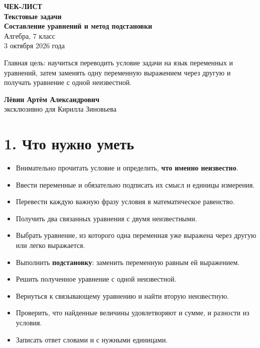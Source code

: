 \documentclass[a4paper,12pt]{article}
\newcommand{\checkitem}{\item[$\square$]}
\newcommand{\key}[1]{\textbf{\color{darkaccent}#1}}
\newcommand{\sepLine}{\vspace{0.35em}{\color{accent}\hrule height 0.6pt}\vspace{0.8em}}
\begin{document}
\thispagestyle{empty}
\begin{center}
\vspace*{25mm}
{\Large\color{accent}\textbf{ЧЕК-ЛИСТ}}\\[8mm]
{\huge\bfseries Текстовые задачи}\\[3mm]
{\LARGE\bfseries Составление уравнений и метод подстановки}\\[13mm]
{\large Алгебра, 7 класс}\\[4mm]
{\large 3 октября 2026 года}\\[20mm]

\begin{minipage}{0.78\textwidth}
\centering
\large
Главная цель: научиться переводить условие задачи на язык переменных и уравнений, затем заменять одну переменную выражением через другую и получать уравнение с одной неизвестной.
\end{minipage}

\vfill
{\large\textbf{Лёвин Артём Александрович}}\\[2mm]
{\normalsize эксклюзивно для Кирилла Зиновьева}

\vspace{12mm}
\end{center}
\clearpage

\section*{1. Что нужно уметь}
\sepLine

\begin{itemize}
\checkitem Внимательно прочитать условие и определить, \key{что именно неизвестно}.
\checkitem Ввести переменные и обязательно подписать их смысл и единицы измерения.
\checkitem Перевести каждую важную фразу условия в математическое равенство.
\checkitem Получить два связанных уравнения с двумя неизвестными.
\checkitem Выбрать уравнение, из которого одна переменная уже выражена через другую или легко выражается.
\checkitem Выполнить \key{подстановку}: заменить переменную равным ей выражением.
\checkitem Решить полученное уравнение с одной неизвестной.
\checkitem Вернуться к связывающему уравнению и найти вторую неизвестную.
\checkitem Проверить, что найденные величины удовлетворяют и сумме, и разности из условия.
\checkitem Записать ответ словами и с нужными единицами.
\end{itemize}
\end{document}

